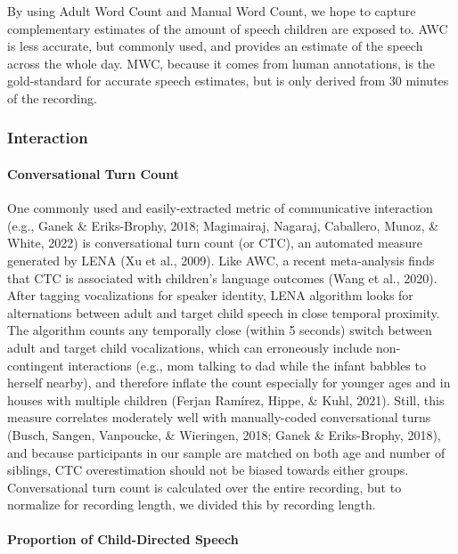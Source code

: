 \documentclass[
  man]{apa6}
\let\oldparagraph\paragraph
\renewcommand{\paragraph}[1]{\oldparagraph{#1}\mbox{}}
\begin{document}
By using Adult Word Count and Manual Word Count, we hope to capture complementary estimates of the amount of speech children are exposed to. AWC is less accurate, but commonly used, and provides an estimate of the speech across the whole day. MWC, because it comes from human annotations, is the gold-standard for accurate speech estimates, but is only derived from 30 minutes of the recording.

\hypertarget{interaction}{%
\subsubsection{Interaction}\label{interaction}}

\hypertarget{conversational-turn-count}{%
\paragraph{Conversational Turn Count}\label{conversational-turn-count}}

One commonly used and easily-extracted metric of communicative interaction (e.g., Ganek \& Eriks-Brophy, 2018; Magimairaj, Nagaraj, Caballero, Munoz, \& White, 2022) is conversational turn count (or CTC), an automated measure generated by LENA (Xu et al., 2009). Like AWC, a recent meta-analysis finds that CTC is associated with children's language outcomes (Wang et al., 2020). After tagging vocalizations for speaker identity, LENA algorithm looks for alternations between adult and target child speech in close temporal proximity. The algorithm counts any temporally close (within 5 seconds) switch between adult and target child vocalizations, which can erroneously include non-contingent interactions (e.g., mom talking to dad while the infant babbles to herself nearby), and therefore inflate the count especially for younger ages and in houses with multiple children (Ferjan Ramírez, Hippe, \& Kuhl, 2021). Still, this measure correlates moderately well with manually-coded conversational turns (Busch, Sangen, Vanpoucke, \& Wieringen, 2018; Ganek \& Eriks-Brophy, 2018), and because participants in our sample are matched on both age and number of siblings, CTC overestimation should not be biased towards either groups. Conversational turn count is calculated over the entire recording, but to normalize for recording length, we divided this by recording length.

\hypertarget{proportion-of-child-directed-speech}{%
\paragraph{Proportion of Child-Directed Speech}\label{proportion-of-child-directed-speech}}
\end{document}
